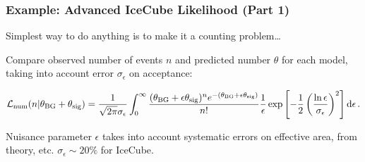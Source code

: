 \documentclass[xcolor=dvipsnames]{beamer}
\newcommand{\Like}{\mathcal{L}}
\begin{document}
\begin{frame}
\frametitle{Example: Advanced IceCube Likelihood (Part 1)}

Simplest way to do anything is to make it a counting problem\ldots

\vspace{5mm}

Compare observed number of events $n$ and predicted number $\theta$ for each model, taking into account error $\sigma_\epsilon$ on acceptance:

\begin{equation}
\label{fancy}
\scriptsize
\Like_\mathrm{num}(n|\theta_\mathrm{BG}+\theta_\mathrm{sig}) = \frac{1}{\sqrt{2\pi}\sigma_\epsilon}\int_0^\infty \frac{(\theta_\mathrm{BG}+\epsilon\theta_\mathrm{sig})^{n}e^{-(\theta_\mathrm{BG}+\epsilon\theta_\mathrm{sig})}}{n!}\frac1\epsilon\exp\left[-\frac{1}{2}\left(\frac{\ln\epsilon}{\sigma_\epsilon}\right)^2\right]\mathrm{d}\epsilon \, .
\end{equation}
\vspace{3mm}

Nuisance parameter $\epsilon$ takes into account systematic errors on effective area, from theory, etc.  $\sigma_\epsilon\sim20\%$ for IceCube.



\end{frame}
\end{document}
